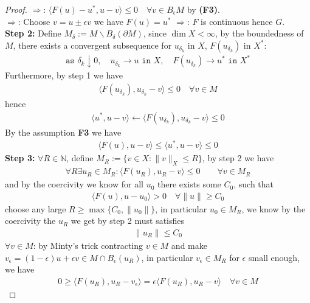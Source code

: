 \documentclass[a4paper,11pt,oneside,fleqn]{book}
\theoremstyle{definition}
\theoremstyle{remark}
\begin{document}
\begin{proof}
$\Rightarrow$: $\langle F(u) - u^*, u - v \rangle \le 0 \quad \forall v \in B_\epsilon M$ by \textbf{(F3)}. \\
$\Rightarrow$: Choose $v = u \pm \epsilon v$ we have $F(u) = u^*$
$\Rightarrow$: $F$ is continuous hence $G$. \\
\textbf{Step 2:} Define $M_\delta := M \backslash B_\delta(\partial M)$, since $\dim X < \infty$, by the boundedness of $M$, there exists a convergent subsequence for $u_{\delta_k}$ in $X$, $F(u_{\delta_k})$ in $X^*$:
\begin{align*}
	\texttt{as }\delta_k \downarrow 0, \quad u_{\delta_k} \rightarrow u \texttt{ in } X, \quad
	F(u_{\delta_k}) \rightarrow u^* \texttt{ in } X^* 
\end{align*}
Furthermore, by step 1 we have
\begin{align*}
	\langle F(u_{\delta_k}), u_{\delta_k} - v \rangle \le 0 \quad \forall v \in M
\end{align*}
hence
\begin{align*}
	\langle u^*, u - v \rangle \leftarrow \langle F(u_{\delta_k}), u_{\delta_k} - v \rangle \le 0
\end{align*}
By the assumption \textbf{F3} we have
\begin{align*}
	\langle F(u), u - v\rangle \le \langle u^*, u - v \rangle \le 0
\end{align*}
\textbf{Step 3: }
$\forall R \in \mathbb{N}$, define $M_R:= \{ v \in X: \|v\|_X \le R\}$, by step 2 we have
\begin{align*}
	\forall R  \exists u_R \in M_R: \langle F(u_R), u_R - v \rangle \le 0 \qquad \forall v \in M_R
\end{align*}
and by the coercivity we know for all $u_0$ there exists some $C_0$, such that
\begin{align*}
	\langle F(u), u - u_0 \rangle > 0  \quad \forall \|u \| \ge C_0
\end{align*}
choose any large $R \ge \max\{C_0, \|u_0\|\}$, in particular $u_0 \in M_R$, we know by the coercivity the $u_R$ we get by step 2 must satisfies
\begin{align*}
	\|u_R\| \le C_0
\end{align*}
$\forall v \in M$: by Minty's trick contracting $v \in M$ and make  $v_\epsilon = (1 - \epsilon) u + \epsilon v \in M \cap B_\epsilon(u_R) $, in particular $v_\epsilon \in M_R$ for $\epsilon$ small enough, we have
\begin{align*}
	0 \ge \langle F(u_R), u_R - v_\epsilon \rangle = \epsilon \langle F(u_R), u_R - v \rangle \quad \forall v \in M
\end{align*} 
\end{proof}
\end{document}
